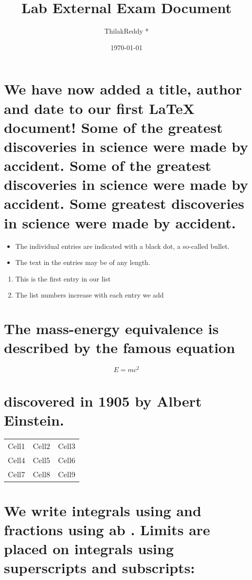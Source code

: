 \documentclass[a4paper,10pt]{article}
\title{\textbf{Lab External Exam Document}}
\author{ThilakReddy *}
\date{\today}
\begin{document}
\maketitle

\section*{We have now added a title, author and date to our first \LaTeX{} document!
Some of the greatest discoveries in science were made by accident. Some of
the greatest discoveries in science were made by accident. \textsf{Some greatest
discoveries in science were made by accident.}}

\begin{itemize}
 \item The individual entries are indicated with a black dot, a so-called bullet.
 \item The text in the entries may be of any length.
\end{itemize}

\begin{enumerate}
 \item This is the first entry in our list
 \item The list numbers increase with each entry we add
\end{enumerate}

\section*{The mass-energy equivalence is described by the famous equation}
\begin{equation}
 E = mc^2
\end{equation}

\section*{discovered in 1905 by Albert Einstein.}


\begin{center}
\begin{tabular}{|c|c|c|}
\hline
    Cell1 & Cell2 & Cell3 \\
    Cell4 & Cell5 & Cell6 \\
    Cell7 & Cell8 & Cell9 \\
\hline
\end{tabular}
\end{center}

\section*{We write integrals using and fractions using ab . Limits are placed on integrals
using superscripts and subscripts:}
\end{document}
